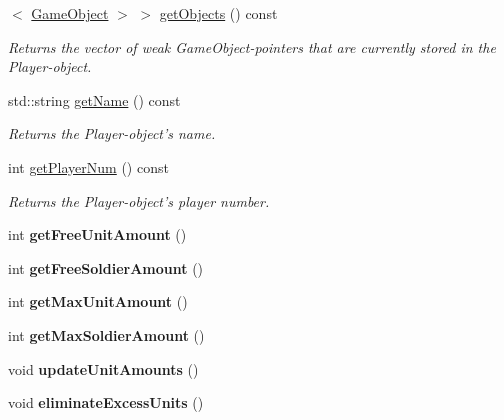 \begin{DoxyCompactItemize}
$<$ \hyperlink{class_course_1_1_game_object}{Game\-Object} $>$ $>$ \hyperlink{class_course_1_1_player_base_a802f8124306757ed976cdd126ce8000c}{get\-Objects} () const 
\begin{DoxyCompactList}\small\item\em Returns the vector of weak Game\-Object-\/pointers that are currently stored in the Player-\/object. \end{DoxyCompactList}\item 
std\-::string \hyperlink{class_course_1_1_player_base_af8d645391faa31a9ca0abf67812256de}{get\-Name} () const 
\begin{DoxyCompactList}\small\item\em Returns the Player-\/object's name. \end{DoxyCompactList}\item 
int \hyperlink{class_course_1_1_player_base_a9146a583bdeda1d715065ca38d9e006c}{get\-Player\-Num} () const 
\begin{DoxyCompactList}\small\item\em Returns the Player-\/object's player number. \end{DoxyCompactList}\item 
\hypertarget{class_course_1_1_player_base_a89b32c940fd18ee981ae6816fbd351dd}{int {\bfseries get\-Free\-Unit\-Amount} ()}\label{class_course_1_1_player_base_a89b32c940fd18ee981ae6816fbd351dd}

\item 
\hypertarget{class_course_1_1_player_base_a79b25ec8513637eddd65858e9db66e00}{int {\bfseries get\-Free\-Soldier\-Amount} ()}\label{class_course_1_1_player_base_a79b25ec8513637eddd65858e9db66e00}

\item 
\hypertarget{class_course_1_1_player_base_a461fc4888ff3df3fa3ce37344ec30d7c}{int {\bfseries get\-Max\-Unit\-Amount} ()}\label{class_course_1_1_player_base_a461fc4888ff3df3fa3ce37344ec30d7c}

\item 
\hypertarget{class_course_1_1_player_base_a71781e6d843a01219235586c75e717d0}{int {\bfseries get\-Max\-Soldier\-Amount} ()}\label{class_course_1_1_player_base_a71781e6d843a01219235586c75e717d0}

\item 
\hypertarget{class_course_1_1_player_base_a534f4e2041cf01f5b40dfe417e39bd68}{void {\bfseries update\-Unit\-Amounts} ()}\label{class_course_1_1_player_base_a534f4e2041cf01f5b40dfe417e39bd68}

\item 
\hypertarget{class_course_1_1_player_base_aa26a70f38a9a11b8253974df6fd2d52a}{void {\bfseries eliminate\-Excess\-Units} ()}\label{class_course_1_1_player_base_aa26a70f38a9a11b8253974df6fd2d52a}


\end{DoxyCompactItemize}
